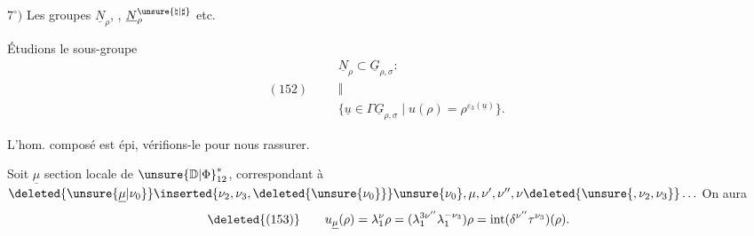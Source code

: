 
$7^\circ)$ Les groupes $\underline N_\rho$, , $\underline N_\rho^{\unsure{\natural|\sharp}}$ etc.

Étudions le sous-groupe
\[
(152)\qquad
\begin{gathered}
\underline N_\rho\subset\underline G_{\rho,\sigma}:\\[-2pt]
\Vert\\[-2pt]
\{\underline u\in\Gamma\underline G_{\rho,\sigma}\mid u(\rho)=\rho^{\varepsilon_3(\underline u)}\}.
\end{gathered}
\]

 L'hom. composé
est épi,  vérifions-le pour nous rassurer.

Soit $\underline\mu$ section locale de $\unsure{\mathbb D|\Phi}_{12}^{*}$, correspondant à
$\deleted{\unsure{\underline\mu|\nu_0}}\inserted{\nu_2,\nu_3,\deleted{\unsure{\nu_0}}}\unsure{\nu_0},\mu,\nu',\nu'',\nu\deleted{\unsure{,\nu_2,\nu_3}}\ldots$
On aura
\[
\deleted{(153)}\qquad
u_{\underline\mu}(\rho)=\lambda_1^\nu\rho
=(\lambda_1^{3\nu''}\lambda_1^{-\nu_3})\rho
=\operatorname{int}(\delta^{\nu''}\tau^{\nu_3})(\rho).
\]


